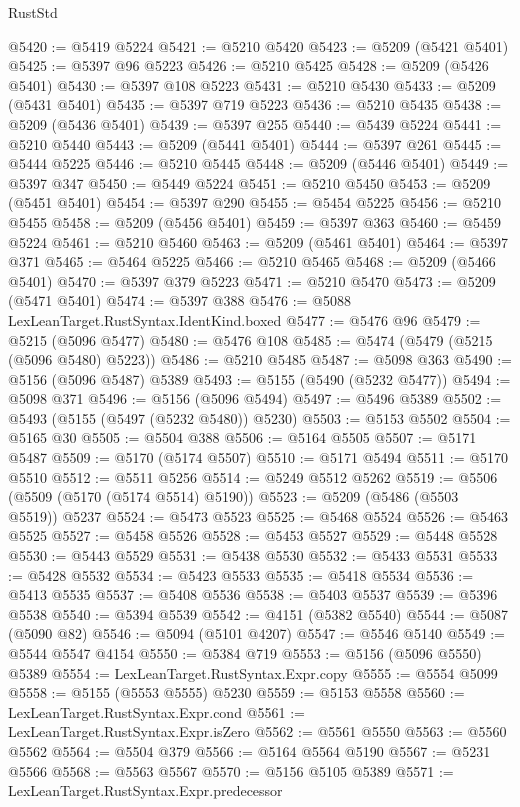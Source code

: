 \begin{lexlean}{RustStd}
\begin{coremodule}
@5420 := @5419 @5224
@5421 := @5210 @5420
@5423 := @5209 (@5421 @5401)
@5425 := @5397 @96 @5223
@5426 := @5210 @5425
@5428 := @5209 (@5426 @5401)
@5430 := @5397 @108 @5223
@5431 := @5210 @5430
@5433 := @5209 (@5431 @5401)
@5435 := @5397 @719 @5223
@5436 := @5210 @5435
@5438 := @5209 (@5436 @5401)
@5439 := @5397 @255
@5440 := @5439 @5224
@5441 := @5210 @5440
@5443 := @5209 (@5441 @5401)
@5444 := @5397 @261
@5445 := @5444 @5225
@5446 := @5210 @5445
@5448 := @5209 (@5446 @5401)
@5449 := @5397 @347
@5450 := @5449 @5224
@5451 := @5210 @5450
@5453 := @5209 (@5451 @5401)
@5454 := @5397 @290
@5455 := @5454 @5225
@5456 := @5210 @5455
@5458 := @5209 (@5456 @5401)
@5459 := @5397 @363
@5460 := @5459 @5224
@5461 := @5210 @5460
@5463 := @5209 (@5461 @5401)
@5464 := @5397 @371
@5465 := @5464 @5225
@5466 := @5210 @5465
@5468 := @5209 (@5466 @5401)
@5470 := @5397 @379 @5223
@5471 := @5210 @5470
@5473 := @5209 (@5471 @5401)
@5474 := @5397 @388
@5476 := @5088 LexLeanTarget.RustSyntax.IdentKind.boxed
@5477 := @5476 @96
@5479 := @5215 (@5096 @5477)
@5480 := @5476 @108
@5485 := @5474 (@5479 (@5215 (@5096 @5480) @5223))
@5486 := @5210 @5485
@5487 := @5098 @363
@5490 := @5156 (@5096 @5487) @5389
@5493 := @5155 (@5490 (@5232 @5477))
@5494 := @5098 @371
@5496 := @5156 (@5096 @5494)
@5497 := @5496 @5389
@5502 := @5493 (@5155 (@5497 (@5232 @5480)) @5230)
@5503 := @5153 @5502
@5504 := @5165 @30
@5505 := @5504 @388
@5506 := @5164 @5505
@5507 := @5171 @5487
@5509 := @5170 (@5174 @5507)
@5510 := @5171 @5494
@5511 := @5170 @5510
@5512 := @5511 @5256
@5514 := @5249 @5512 @5262
@5519 := @5506 (@5509 (@5170 (@5174 @5514) @5190))
@5523 := @5209 (@5486 (@5503 @5519)) @5237
@5524 := @5473 @5523
@5525 := @5468 @5524
@5526 := @5463 @5525
@5527 := @5458 @5526
@5528 := @5453 @5527
@5529 := @5448 @5528
@5530 := @5443 @5529
@5531 := @5438 @5530
@5532 := @5433 @5531
@5533 := @5428 @5532
@5534 := @5423 @5533
@5535 := @5418 @5534
@5536 := @5413 @5535
@5537 := @5408 @5536
@5538 := @5403 @5537
@5539 := @5396 @5538
@5540 := @5394 @5539
@5542 := @4151 (@5382 @5540)
@5544 := @5087 (@5090 @82)
@5546 := @5094 (@5101 @4207)
@5547 := @5546 @5140
@5549 := @5544 @5547 @4154
@5550 := @5384 @719
@5553 := @5156 (@5096 @5550) @5389
@5554 := LexLeanTarget.RustSyntax.Expr.copy
@5555 := @5554 @5099
@5558 := @5155 (@5553 @5555) @5230
@5559 := @5153 @5558
@5560 := LexLeanTarget.RustSyntax.Expr.cond
@5561 := LexLeanTarget.RustSyntax.Expr.isZero
@5562 := @5561 @5550
@5563 := @5560 @5562
@5564 := @5504 @379
@5566 := @5164 @5564 @5190
@5567 := @5231 @5566
@5568 := @5563 @5567
@5570 := @5156 @5105 @5389
@5571 := LexLeanTarget.RustSyntax.Expr.predecessor

\end{coremodule}
\end{lexlean}
